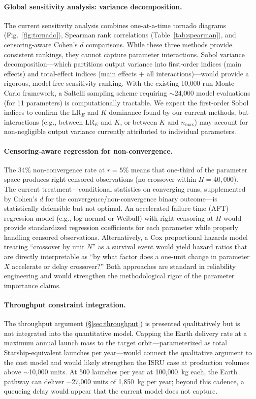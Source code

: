 \documentclass[preprint,12pt]{elsarticle}
\begin{document}
\paragraph{Global sensitivity analysis: variance decomposition.} The current sensitivity analysis combines one-at-a-time tornado diagrams (Fig.~\ref{fig:tornado}), Spearman rank correlations (Table~\ref{tab:spearman}), and censoring-aware Cohen's $d$ comparisons. While these three methods provide consistent rankings, they cannot capture parameter interactions. Sobol variance decomposition---which partitions output variance into first-order indices (main effects) and total-effect indices (main effects $+$ all interactions)---would provide a rigorous, model-free sensitivity ranking. With the existing 10{,}000-run Monte Carlo framework, a Saltelli sampling scheme requiring $\sim$24{,}000 model evaluations (for 11 parameters) is computationally tractable. We expect the first-order Sobol indices to confirm the LR$_E$ and $K$ dominance found by our current methods, but interactions (e.g., between LR$_E$ and $K$, or between $K$ and $\dot{n}_{\max}$) may account for non-negligible output variance currently attributed to individual parameters.

\paragraph{Censoring-aware regression for non-convergence.} The 34\% non-convergence rate at $r = 5\%$ means that one-third of the parameter space produces right-censored observations (no crossover within $H = 40{,}000$). The current treatment---conditional statistics on converging runs, supplemented by Cohen's $d$ for the convergence/non-convergence binary outcome---is statistically defensible but not optimal. An accelerated failure time (AFT) regression model (e.g., log-normal or Weibull) with right-censoring at $H$ would provide standardized regression coefficients for each parameter while properly handling censored observations. Alternatively, a Cox proportional hazards model treating ``crossover by unit $N$'' as a survival event would yield hazard ratios that are directly interpretable as ``by what factor does a one-unit change in parameter $X$ accelerate or delay crossover?'' Both approaches are standard in reliability engineering and would strengthen the methodological rigor of the parameter importance claims.

\paragraph{Throughput constraint integration.} The throughput argument (\S\ref{sec:throughput}) is presented qualitatively but is not integrated into the quantitative model. Capping the Earth delivery rate at a maximum annual launch mass to the target orbit---parameterized as total Starship-equivalent launches per year---would connect the qualitative argument to the cost model and would likely strengthen the ISRU case at production volumes above $\sim$10{,}000 units. At 500 launches per year at 100{,}000~kg each, the Earth pathway can deliver $\sim$27{,}000 units of 1{,}850~kg per year; beyond this cadence, a queueing delay would appear that the current model does not capture.
\end{document}
